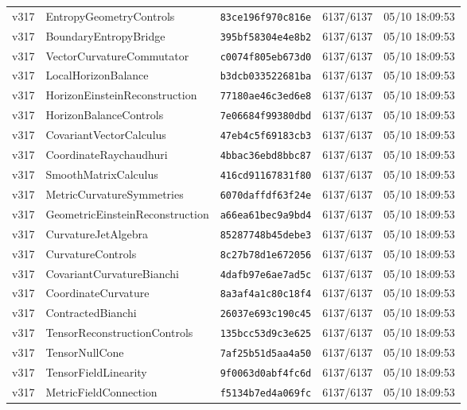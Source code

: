 \documentclass[11pt]{article}
\theoremstyle{definition}\newtheorem{deriv}{Derivação}
\begin{document}
{\begin{longtable}{@{}lllll@{}}
v317 & EntropyGeometryControls & \texttt{83ce196f970c816e} & 6137/6137 & 05/10 18:09:53 \\
v317 & BoundaryEntropyBridge & \texttt{395bf58304e4e8b2} & 6137/6137 & 05/10 18:09:53 \\
v317 & VectorCurvatureCommutator & \texttt{c0074f805eb673d0} & 6137/6137 & 05/10 18:09:53 \\
v317 & LocalHorizonBalance & \texttt{b3dcb033522681ba} & 6137/6137 & 05/10 18:09:53 \\
v317 & HorizonEinsteinReconstruction & \texttt{77180ae46c3ed6e8} & 6137/6137 & 05/10 18:09:53 \\
v317 & HorizonBalanceControls & \texttt{7e06684f99380dbd} & 6137/6137 & 05/10 18:09:53 \\
v317 & CovariantVectorCalculus & \texttt{47eb4c5f69183cb3} & 6137/6137 & 05/10 18:09:53 \\
v317 & CoordinateRaychaudhuri & \texttt{4bbac36ebd8bbc87} & 6137/6137 & 05/10 18:09:53 \\
v317 & SmoothMatrixCalculus & \texttt{416cd91167831f80} & 6137/6137 & 05/10 18:09:53 \\
v317 & MetricCurvatureSymmetries & \texttt{6070daffdf63f24e} & 6137/6137 & 05/10 18:09:53 \\
v317 & GeometricEinsteinReconstruction & \texttt{a66ea61bec9a9bd4} & 6137/6137 & 05/10 18:09:53 \\
v317 & CurvatureJetAlgebra & \texttt{85287748b45debe3} & 6137/6137 & 05/10 18:09:53 \\
v317 & CurvatureControls & \texttt{8c27b78d1e672056} & 6137/6137 & 05/10 18:09:53 \\
v317 & CovariantCurvatureBianchi & \texttt{4dafb97e6ae7ad5c} & 6137/6137 & 05/10 18:09:53 \\
v317 & CoordinateCurvature & \texttt{8a3af4a1c80c18f4} & 6137/6137 & 05/10 18:09:53 \\
v317 & ContractedBianchi & \texttt{26037e693c190c45} & 6137/6137 & 05/10 18:09:53 \\
v317 & TensorReconstructionControls & \texttt{135bcc53d9c3e625} & 6137/6137 & 05/10 18:09:53 \\
v317 & TensorNullCone & \texttt{7af25b51d5aa4a50} & 6137/6137 & 05/10 18:09:53 \\
v317 & TensorFieldLinearity & \texttt{9f0063d0abf4fc6d} & 6137/6137 & 05/10 18:09:53 \\
v317 & MetricFieldConnection & \texttt{f5134b7ed4a069fc} & 6137/6137 & 05/10 18:09:53 \\

\end{longtable}}
\end{document}
